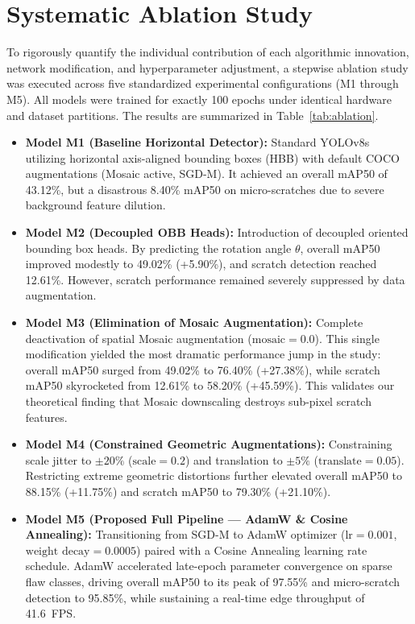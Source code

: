 \section{Systematic Ablation Study}
\label{sec:ablation}

To rigorously quantify the individual contribution of each algorithmic innovation, network modification, and hyperparameter adjustment, a stepwise ablation study was executed across five standardized experimental configurations (M1 through M5). All models were trained for exactly 100 epochs under identical hardware and dataset partitions. The results are summarized in Table~\ref{tab:ablation}.

\begin{itemize}
\item \textbf{Model M1 (Baseline Horizontal Detector):} Standard YOLOv8s utilizing horizontal axis-aligned bounding boxes (HBB) with default COCO augmentations (Mosaic active, SGD-M). It achieved an overall mAP50 of 43.12\%, but a disastrous 8.40\% mAP50 on micro-scratches due to severe background feature dilution.
\item \textbf{Model M2 (Decoupled OBB Heads):} Introduction of decoupled oriented bounding box heads. By predicting the rotation angle $\theta$, overall mAP50 improved modestly to 49.02\% (+5.90\%), and scratch detection reached 12.61\%. However, scratch performance remained severely suppressed by data augmentation.
\item \textbf{Model M3 (Elimination of Mosaic Augmentation):} Complete deactivation of spatial Mosaic augmentation ($\text{mosaic} = 0.0$). This single modification yielded the most dramatic performance jump in the study: overall mAP50 surged from 49.02\% to 76.40\% (+27.38\%), while scratch mAP50 skyrocketed from 12.61\% to 58.20\% (+45.59\%). This validates our theoretical finding that Mosaic downscaling destroys sub-pixel scratch features.
\item \textbf{Model M4 (Constrained Geometric Augmentations):} Constraining scale jitter to $\pm 20\%$ ($\text{scale} = 0.2$) and translation to $\pm 5\%$ ($\text{translate} = 0.05$). Restricting extreme geometric distortions further elevated overall mAP50 to 88.15\% (+11.75\%) and scratch mAP50 to 79.30\% (+21.10\%).
\item \textbf{Model M5 (Proposed Full Pipeline --- AdamW \& Cosine Annealing):} Transitioning from SGD-M to AdamW optimizer ($\text{lr} = 0.001$, $\text{weight decay} = 0.0005$) paired with a Cosine Annealing learning rate schedule. AdamW accelerated late-epoch parameter convergence on sparse flaw classes, driving overall mAP50 to its peak of 97.55\% and micro-scratch detection to 95.85\%, while sustaining a real-time edge throughput of 41.6~FPS.
\end{itemize}

